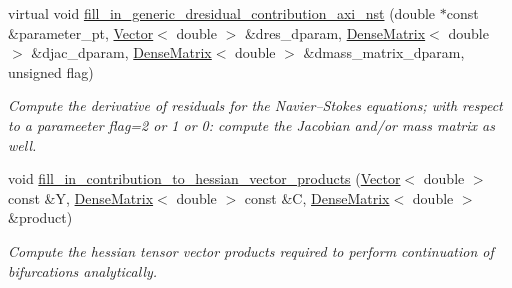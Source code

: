 \begin{DoxyCompactItemize}
virtual void \hyperlink{classoomph_1_1AxisymmetricNavierStokesEquations_a19a4b0c9d98bd79212fe8b507d44f7ab}{fill\+\_\+in\+\_\+generic\+\_\+dresidual\+\_\+contribution\+\_\+axi\+\_\+nst} (double $\ast$const \&parameter\+\_\+pt, \hyperlink{classoomph_1_1Vector}{Vector}$<$ double $>$ \&dres\+\_\+dparam, \hyperlink{classoomph_1_1DenseMatrix}{Dense\+Matrix}$<$ double $>$ \&djac\+\_\+dparam, \hyperlink{classoomph_1_1DenseMatrix}{Dense\+Matrix}$<$ double $>$ \&dmass\+\_\+matrix\+\_\+dparam, unsigned flag)
\begin{DoxyCompactList}\small\item\em Compute the derivative of residuals for the Navier--Stokes equations; with respect to a parameeter flag=2 or 1 or 0\+: compute the Jacobian and/or mass matrix as well. \end{DoxyCompactList}\item 
void \hyperlink{classoomph_1_1AxisymmetricNavierStokesEquations_a295dab32c432e6f2597db7aa78c306d9}{fill\+\_\+in\+\_\+contribution\+\_\+to\+\_\+hessian\+\_\+vector\+\_\+products} (\hyperlink{classoomph_1_1Vector}{Vector}$<$ double $>$ const \&Y, \hyperlink{classoomph_1_1DenseMatrix}{Dense\+Matrix}$<$ double $>$ const \&C, \hyperlink{classoomph_1_1DenseMatrix}{Dense\+Matrix}$<$ double $>$ \&product)
\begin{DoxyCompactList}\small\item\em Compute the hessian tensor vector products required to perform continuation of bifurcations analytically. \end{DoxyCompactList}\end{DoxyCompactItemize}
